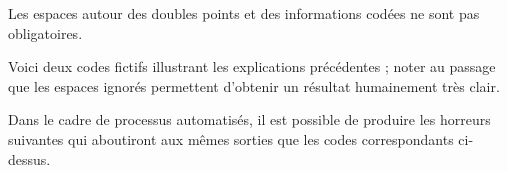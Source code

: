 \documentclass[10pt, a4paper]{article}
\begin{document}






\begin{tdocnote}
    Les espaces autour des doubles points et des informations codées ne sont pas obligatoires.
\end{tdocnote}




Voici deux codes fictifs illustrant les explications précédentes ; noter au passage que les espaces ignorés permettent d'obtenir un résultat humainement très clair.
\begin{multicols}{2}

\end{multicols}

Dans le cadre de processus automatisés, il est possible de produire les horreurs suivantes qui aboutiront aux mêmes sorties que les codes correspondants ci-dessus.
\begin{multicols}{2}

\end{multicols}
\end{document}

